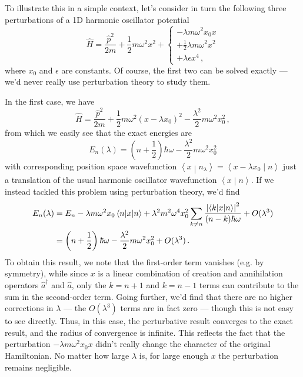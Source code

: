 \documentclass{article}
\theoremstyle{plain}\theoremheaderfont{\normalfont\itshape}\theorembodyfont{\rmfamily}\theoremseparator{.}\newtheorem*{rem}{Remark}\newtheorem*{ex}{Example}\newtheorem*{proof}{Proof}\newtheorem*{altp}{Alternative proof}
\theoremstyle{plain}\theoremheaderfont{\normalfont\bfseries}\theorembodyfont{\rmfamily}\theoremseparator{.}\newtheorem{thm}{Theorem}[section]\newtheorem{lem}[thm]{Lemma}\newtheorem{prop}[thm]{Proposition}\newtheorem*{cor}{Corollary}\newtheorem{defn}[thm]{Definition}\newtheorem{clm}[thm]{Claim}\newtheorem{clminproof}{Claim}
\theoremstyle{break}\theoremheaderfont{\normalfont\itshape}\theorembodyfont{\rmfamily}\theoremseparator{.\medskip}\newtheorem*{proofskip}{Proof}\newtheorem*{exs}{Examples}\newtheorem*{rems}{Remarks}
\theoremstyle{break}\theoremheaderfont{\normalfont\bfseries}\theorembodyfont{\rmfamily}\theoremseparator{.\medskip}\newtheorem{lemskip}[thm]{Lemma}\newtheorem{defnskip}[thm]{Definition}\newtheorem{propskip}[thm]{Proposition}\newtheorem{thmskip}[thm]{Theorem}
\numberwithin{equation}{section}
\newcommand{\braket}[2]{\left\langle #1 \middle| #2 \right\rangle}
\newcommand{\mel}[3]{\left\langle #1 \middle| #2 \middle| #3 \right\rangle}
\newcommand{\expval}[2]{\left\langle #2 \middle| #1 \middle| #2 \right\rangle}
\newcommand{\abs}[1]{\left| #1 \right|}
\begin{document}
    To illustrate this in a simple context, let's consider in turn the following three perturbations of a 1D harmonic oscillator potential
    \begin{equation}
        \hat{H}=\frac{\hat{p}^2}{2m}+\frac{1}{2}m\omega^2x^2+\begin{cases}
            -\lambda m\omega^2 x_0x\\
            +\frac{1}{2}\lambda m\omega^2x^2\\
            +\lambda\epsilon x^4\,,
        \end{cases}
    \end{equation}
    where \(x_0\) and \(\epsilon\) are constants. Of course, the first two can be solved exactly --- we'd never really use perturbation theory to study them.

    In the first case, we have
    \begin{equation}
        \hat{H}=\frac{\hat{p}^2}{2m}+\frac{1}{2}m\omega^2(x-\lambda x_0)^2-\frac{\lambda^2}{2}m\omega^2x_0^2\,,
    \end{equation}
    from which we easily see that the exact energies are
    \begin{equation}
        E_n(\lambda)=\left(n+\frac{1}{2}\right)\hbar\omega-\frac{\lambda^2}{2}m\omega^2 x_0^2
    \end{equation}
    with corresponding position space wavefunction \(\braket{x}{n_\lambda}=\braket{x-\lambda x_0}{n}\) just a translation of the usual harmonic oscillator wavefunction \(\braket{x}{n}\). If we instead tackled this problem using perturbation theory, we'd find
    \begin{align}
        E_n(\lambda)&=E_n-\lambda m\omega^2 x_0\expval{x}{n}+\lambda^2 m^2 \omega^4 x_0^2 \sum_{k\ne n}\frac{\abs{\mel{k}{x}{n}}^2}{(n-k)\hbar\omega}+O(\lambda^3)\notag\\
        &=\left(n+\frac{1}{2}\right)\hbar\omega-\frac{\lambda^2}{2}m\omega^2 x_0^2 +O(\lambda^3)\,.
    \end{align}
    To obtain this result, we note that the first-order term vanishes (e.g. by symmetry), while since \(x\) is a linear combination of creation and annihilation operators \(\hat{a}^\dagger\) and \(\hat{a}\), only the \(k=n+1\) and \(k=n-1\) terms can contribute to the sum in the second-order term. Going further, we'd find that there are no higher corrections in \(\lambda\) --- the \(O(\lambda^3)\) terms are in fact zero --- though this is not easy to see directly. Thus, in this case, the perturbative result converges to the exact result, and the radius of convergence is infinite. This reflects the fact that the perturbation \(-\lambda m\omega^2 x_0x\) didn't really change the character of the original Hamiltonian. No matter how large \(\lambda\) is, for large enough \(x\) the perturbation remains negligible.
\end{document}
